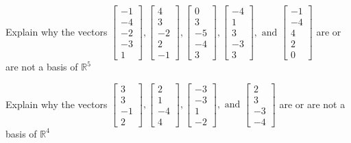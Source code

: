 \documentclass{article}
\begin{document}
\begin{exerciseStatement}
    Explain why the vectors \(\left[\begin{array}{r}
-1 \\
-4 \\
-2 \\
-3 \\
1
\end{array}\right] , \left[\begin{array}{r}
4 \\
3 \\
-2 \\
2 \\
-1
\end{array}\right] , \left[\begin{array}{r}
0 \\
3 \\
-5 \\
-4 \\
3
\end{array}\right] , \left[\begin{array}{r}
-4 \\
1 \\
3 \\
-3 \\
3
\end{array}\right] , \text{ and } \left[\begin{array}{r}
-1 \\
-4 \\
4 \\
2 \\
0
\end{array}\right]\) are or are not a basis of \(\mathbb{R}^5\)


  
\end{exerciseStatement}

\begin{exerciseStatement}
    Explain why the vectors \(\left[\begin{array}{r}
3 \\
3 \\
-1 \\
2
\end{array}\right] , \left[\begin{array}{r}
2 \\
1 \\
-4 \\
4
\end{array}\right] , \left[\begin{array}{r}
-3 \\
-3 \\
1 \\
-2
\end{array}\right] , \text{ and } \left[\begin{array}{r}
2 \\
3 \\
-3 \\
-4
\end{array}\right]\) are or are not a basis of \(\mathbb{R}^4\)


  
\end{exerciseStatement}
\end{document}
